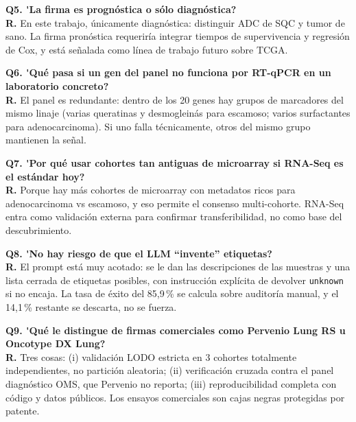 \documentclass[11pt, a4paper]{article}
\begin{document}
\begin{prcaja}
\textbf{Q5. \'{}La firma es progn\'ostica o s\'olo diagn\'ostica?}\\[4pt]
\textbf{R.} En este trabajo, \'unicamente diagn\'ostica: distinguir ADC de SQC y tumor de sano. La firma pron\'ostica requerir\'ia integrar tiempos de supervivencia y regresi\'on de Cox, y est\'a se\~nalada como l\'inea de trabajo futuro sobre TCGA.
\end{prcaja}

\begin{prcaja}
\textbf{Q6. \'{}Qu\'e pasa si un gen del panel no funciona por RT-qPCR en un laboratorio concreto?}\\[4pt]
\textbf{R.} El panel es redundante: dentro de los 20 genes hay grupos de marcadores del mismo linaje (varias queratinas y desmoglein\'as para escamoso; varios surfactantes para adenocarcinoma). Si uno falla t\'ecnicamente, otros del mismo grupo mantienen la se\~nal.
\end{prcaja}

\begin{prcaja}
\textbf{Q7. \'{}Por qu\'e usar cohortes tan antiguas de microarray si RNA-Seq es el est\'andar hoy?}\\[4pt]
\textbf{R.} Porque hay m\'as cohortes de microarray con metadatos ricos para adenocarcinoma vs escamoso, y eso permite el consenso multi-cohorte. RNA-Seq entra como validaci\'on externa para confirmar transferibilidad, no como base del descubrimiento.
\end{prcaja}

\begin{prcaja}
\textbf{Q8. \'{}No hay riesgo de que el LLM ``invente'' etiquetas?}\\[4pt]
\textbf{R.} El prompt est\'a muy acotado: se le dan las descripciones de las muestras y una lista cerrada de etiquetas posibles, con instrucci\'on expl\'icita de devolver \texttt{unknown} si no encaja. La tasa de \'exito del 85,9\,\% se calcula sobre auditor\'ia manual, y el 14,1\,\% restante se descarta, no se fuerza.
\end{prcaja}

\begin{prcaja}
\textbf{Q9. \'{}Qu\'e le distingue de firmas comerciales como Pervenio Lung RS u Oncotype DX Lung?}\\[4pt]
\textbf{R.} Tres cosas: (i) validaci\'on LODO estricta en 3 cohortes totalmente independientes, no partici\'on aleatoria; (ii) verificaci\'on cruzada contra el panel diagn\'ostico OMS, que Pervenio no reporta; (iii) reproducibilidad completa con c\'odigo y datos p\'ublicos. Los ensayos comerciales son cajas negras protegidas por patente.
\end{prcaja}
\end{document}
